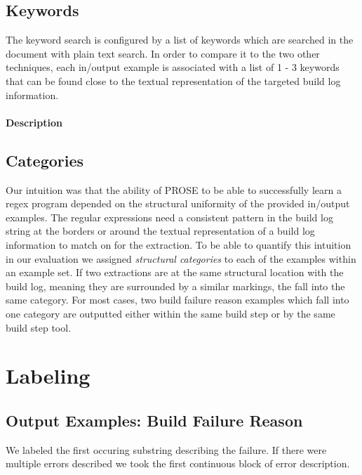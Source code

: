 \documentclass[\myrootdir/main.tex]{subfiles}
\begin{document}
\subsection{Keywords}
The keyword search is configured by a list of keywords which are searched in the document with plain text search. In order to compare it to the two other techniques, each in/output example is associated with a list of 1 - 3 keywords that can be found close to the textual representation of the targeted build log information.

\paragraph{Description}


\subsection{Categories}
Our intuition was that the ability of PROSE to be able to successfully learn a regex program depended on the structural uniformity of the provided in/output examples.
The regular expressions need a consistent pattern in the build log string at the borders or around the textual representation of a build log information to match on for the extraction.
To be able to quantify this intuition in our evaluation we assigned \emph{structural categories} to each of the examples within an example set.
If two extractions are at the same structural location with the build log, meaning they are surrounded by a similar markings, the fall into the same category.
For most cases, two build failure reason examples which fall into one category are outputted either within the same build step or by the same build step tool.

\section{Labeling}
\subsection{Output Examples: Build Failure Reason}
We labeled the first occuring substring describing the failure. If there were multiple errors described we took the first continuous block of error description.
\end{document}
